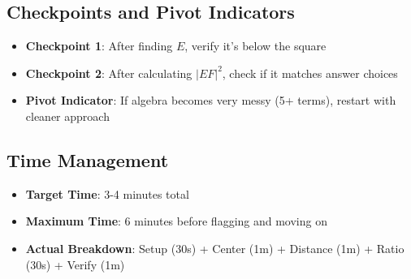 \documentclass[]{article}
\begin{document}
\begin{solutionbox}
\subsection*{Checkpoints and Pivot Indicators}
\begin{itemize}[leftmargin=*]
    \item \textbf{Checkpoint 1}: After finding $E$, verify it's below the square
    \item \textbf{Checkpoint 2}: After calculating $|EF|^2$, check if it matches answer choices
    \item \textbf{Pivot Indicator}: If algebra becomes very messy (5+ terms), restart with cleaner approach
\end{itemize}

\subsection*{Time Management}
\begin{itemize}[leftmargin=*]
    \item \textbf{Target Time}: 3-4 minutes total
    \item \textbf{Maximum Time}: 6 minutes before flagging and moving on
    \item \textbf{Actual Breakdown}: Setup (30s) + Center (1m) + Distance (1m) + Ratio (30s) + Verify (1m)
\end{itemize}
\end{solutionbox}
\end{document}
